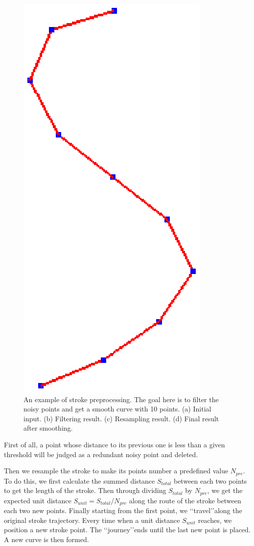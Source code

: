 \begin{figure} [htbp]
{\begin{minipage}[b]{0.2\textwidth}
      \includegraphics[scale=0.3]{figs/f3.strokepre-4.eps}
    \end{minipage}}
  \caption{An example of stroke preprocessing. The goal here is to filter the noisy points and get a smooth curve with 10 points.
  (a) Initial input.
  (b) Filtering result.
  (c) Resampling result.
  (d) Final result after smoothing.}
  \label{fig:alstrokeproc} %
\end{figure}

First of all, a point whose distance to its previous one is less
than a given threshold will be judged as a redundant noisy point and
deleted.

Then we resample the stroke to make its points number a  predefined
value $N_{pre}$. To do this, we first calculate the summed distance
$S_{total}$ between each two points to get the length of the stroke.
Then through dividing $S_{total}$ by $N_{pre}$, we get the expected
unit distance $S_{unit}=S_{total} / N_{pre}$ along the route of the
stroke between each two new points. Finally starting from the first
point, we \lq\lq{travel}\rq\rq along the original stroke trajectory.
Every time when a unit distance $S_{unit}$ reaches, we position a
new stroke point. The \lq\lq{journey}\rq\rq ends until the last new
point is placed. A new curve is then formed.

